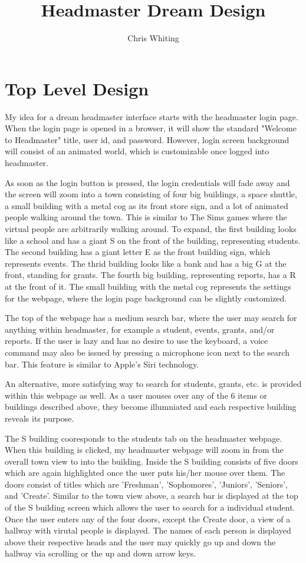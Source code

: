 \documentclass[11pt]{article}
\title{Headmaster Dream Design}
\author{Chris Whiting}
\begin{document}
\maketitle

 
\section{Top Level Design}
My idea for a dream headmaster interface starts with the headmaster login page. When the login page is opened in a browser, it will show the standard "Welcome to Headmaster" title, user id, and password. However, login screen background will consist of an animated world, which is customizable once logged into headmaster.

As soon as the login button is pressed, the login credentials will fade away and the screen will zoom into a town consisting of four big buildings, a space shuttle, a small building with a metal cog as its front store sign, and a lot of animated people walking around the town. This is similar to The Sims games where the virtual people are arbitrarily walking around. To expand, the first building looks like a school and has a giant S on the front of the building, representing students. The second building has a giant letter E as the front building sign, which represents events. The thrid building looks like a bank and has a big G at the front, standing for grants. The fourth big building, representing reports, has a R at the front of it. The small building with the metal cog represents the settings for the webpage, where the login page background can be slightly customized.

 The top of the webpage has a medium search bar, where the user may search for anything within headmaster, for example a student, events, grants, and/or reports. If the user is lazy and has no desire to use the keyboard, a voice command may also be issued by pressing a microphone icon next to the search bar. This feature is similar to Apple's Siri technology. 

An alternative, more satisfying way to search for students, grants, etc. is provided within this webpage as well. As a user mouses over any of the 6 items or buildings described above, they become illumniated and each respective building reveals its purpose. 

The S building cooresponds to the students tab on the headmaster webpage. When this building is clicked, my headmaster webpage will zoom in from the overall town view to into the building. Inside the S building consists of five doors which are again highlighted once the user puts his/her mouse over them. The doors consist of titles which are 'Freshman', 'Sophomores', 'Juniors', 'Seniors', and 'Create'. Similar to the town view above, a search bar is displayed at the top of the S building screen which allows the user to search for a individual student. Once the user enters any of the four doors, except the Create door, a view of a hallway with virutal people is displayed. The names of each person is displayed above their respective heads and the user may quickly go up and down the hallway via scrolling or the up and down arrow keys. 
\end{document}
